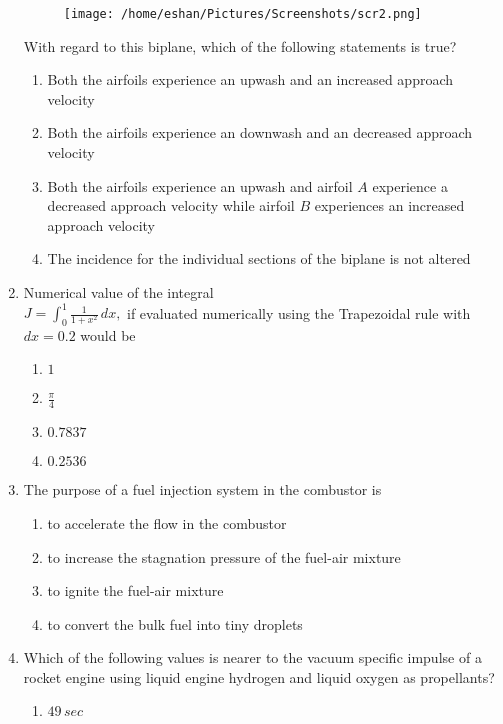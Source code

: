 \documentclass[journal]{IEEEtran}
\begin{document}
\begin{enumerate}
\begin{figure}[h]
    \centering
    \texttt{[image: /home/eshan/Pictures/Screenshots/scr2.png]} 
    \caption{}
    \label{}
\end{figure}
With regard to this biplane, which of the following statements is true?
    \begin{enumerate}
        \item Both the airfoils experience an upwash and an increased approach velocity
        \item Both the airfoils experience an downwash and an decreased approach velocity
        \item Both the airfoils experience an upwash and airfoil $A$ experience a decreased approach velocity while airfoil $B$ experiences  an increased approach velocity
        \item The incidence for the individual sections of the biplane is not altered
    \end{enumerate}
    \item  Numerical value of the integral\\
    $J=\int_{0}^{1}\frac{1}{1+x^2}\, dx,$ if evaluated numerically using the Trapezoidal rule with $dx=0.2$ would be 
    \begin{enumerate}
        \item $1$
        \item $\frac{\pi}{4}$
        \item $0.7837$
        \item $0.2536$
    \end{enumerate}
    \item The purpose of  a fuel injection system in the combustor is
    \begin{enumerate}
        \item to accelerate the flow in the combustor
        \item to increase the stagnation pressure of the fuel-air mixture 
        \item to ignite the fuel-air mixture
        \item to convert the bulk fuel into tiny droplets
    \end{enumerate}
    \item Which of the following values is nearer to the vacuum specific impulse of a rocket engine using liquid engine hydrogen and liquid oxygen as propellants?
    \begin{enumerate}
        \item $49\,sec$

\end{enumerate}
\end{enumerate}
\end{document}
